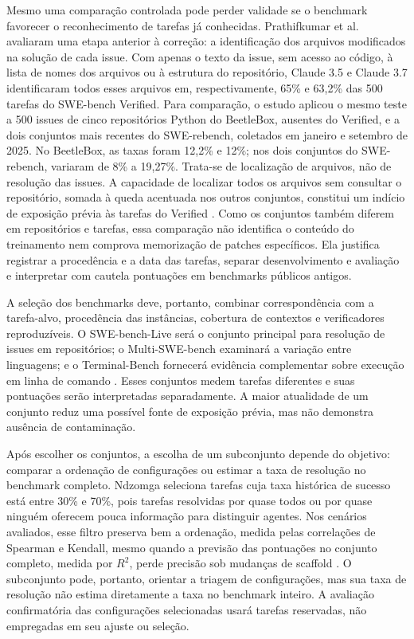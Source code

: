 Mesmo uma comparação controlada pode perder validade se o benchmark favorecer o reconhecimento de tarefas já conhecidas. Prathifkumar et al. avaliaram uma etapa anterior à correção: a identificação dos arquivos modificados na solução de cada issue. Com apenas o texto da issue, sem acesso ao código, à lista de nomes dos arquivos ou à estrutura do repositório, Claude 3.5 e Claude 3.7 identificaram todos esses arquivos em, respectivamente, 65\% e 63,2\% das 500 tarefas do SWE-bench Verified. Para comparação, o estudo aplicou o mesmo teste a 500 issues de cinco repositórios Python do BeetleBox, ausentes do Verified, e a dois conjuntos mais recentes do SWE-rebench, coletados em janeiro e setembro de 2025. No BeetleBox, as taxas foram 12,2\% e 12\%; nos dois conjuntos do SWE-rebench, variaram de 8\% a 19,27\%. Trata-se de localização de arquivos, não de resolução das issues. A capacidade de localizar todos os arquivos sem consultar o repositório, somada à queda acentuada nos outros conjuntos, constitui um indício de exposição prévia às tarefas do Verified \cite{Prathifkumar2025ModelMemory}. Como os conjuntos também diferem em repositórios e tarefas, essa comparação não identifica o conteúdo do treinamento nem comprova memorização de patches específicos. Ela justifica registrar a procedência e a data das tarefas, separar desenvolvimento e avaliação e interpretar com cautela pontuações em benchmarks públicos antigos.

A seleção dos benchmarks deve, portanto, combinar correspondência com a tarefa-alvo, procedência das instâncias, cobertura de contextos e verificadores reproduzíveis. O SWE-bench-Live será o conjunto principal para resolução de issues em repositórios; o Multi-SWE-bench examinará a variação entre linguagens; e o Terminal-Bench fornecerá evidência complementar sobre execução em linha de comando \cite{Zhang2025SWEbenchLive,MultiSWEbench2025,Merrill2026TerminalBench}. Esses conjuntos medem tarefas diferentes e suas pontuações serão interpretadas separadamente. A maior atualidade de um conjunto reduz uma possível fonte de exposição prévia, mas não demonstra ausência de contaminação.

Após escolher os conjuntos, a escolha de um subconjunto depende do objetivo: comparar a ordenação de configurações ou estimar a taxa de resolução no benchmark completo. Ndzomga seleciona tarefas cuja taxa histórica de sucesso está entre 30\% e 70\%, pois tarefas resolvidas por quase todos ou por quase ninguém oferecem pouca informação para distinguir agentes. Nos cenários avaliados, esse filtro preserva bem a ordenação, medida pelas correlações de Spearman e Kendall, mesmo quando a previsão das pontuações no conjunto completo, medida por $R^2$, perde precisão sob mudanças de scaffold \cite{Ndzomga2026EfficientBenchmarking}. O subconjunto pode, portanto, orientar a triagem de configurações, mas sua taxa de resolução não estima diretamente a taxa no benchmark inteiro. A avaliação confirmatória das configurações selecionadas usará tarefas reservadas, não empregadas em seu ajuste ou seleção.

